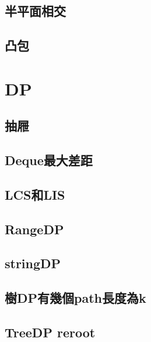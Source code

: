     \subsection{半平面相交}
        
    \subsection{凸包}
        

\section{DP}
    \subsection{抽屜}
        
    \subsection{Deque最大差距}
        
    \subsection{LCS和LIS}
        
    \subsection{RangeDP}
        
    \subsection{stringDP}
        
    \subsection{樹DP有幾個path長度為k}
        
    \subsection{TreeDP reroot}
        
